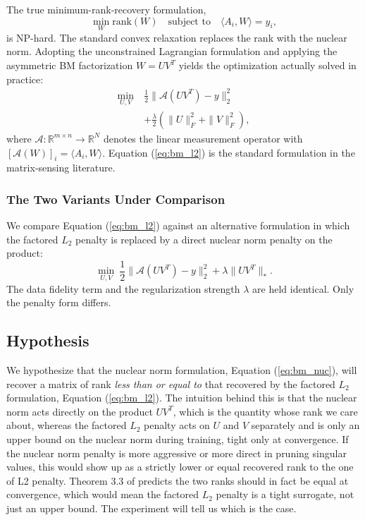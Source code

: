 The true minimum-rank-recovery formulation,
\begin{equation}
    \min_{W} \text{rank}(W) \quad \text{subject to} \quad \langle A_i, W \rangle = y_i,
\end{equation}
is NP-hard. The standard convex relaxation replaces the rank with the nuclear norm. Adopting the unconstrained Lagrangian formulation and applying the asymmetric BM factorization $W = UV^T$ yields the optimization actually solved in practice:
\begin{equation}
\begin{aligned}
    \min_{U, V} \ &\frac{1}{2}\|\mathcal{A}(UV^T) - y\|_2^2 \\
    &+ \frac{\lambda}{2}\left(\|U\|_F^2 + \|V\|_F^2\right),
\end{aligned}
    \label{eq:bm_l2}
\end{equation}
where $\mathcal{A}: \mathbb{R}^{m \times n} \to \mathbb{R}^N$ denotes the linear measurement operator with $[\mathcal{A}(W)]_i = \langle A_i, W \rangle$. Equation (\ref{eq:bm_l2}) is the standard formulation in the matrix-sensing literature.

\subsubsection{The Two Variants Under Comparison}
We compare Equation (\ref{eq:bm_l2}) against an alternative formulation in which the factored $L_2$ penalty is replaced by a direct nuclear norm penalty on the product:
\begin{equation}
    \min_{U, V} \ \frac{1}{2}\|\mathcal{A}(UV^T) - y\|_2^2 + \lambda \|UV^T\|_*.
    \label{eq:bm_nuc}
\end{equation}
The data fidelity term and the regularization strength $\lambda$ are held identical. Only the penalty form differs.

\subsection{Hypothesis}
We hypothesize that the nuclear norm formulation, Equation (\ref{eq:bm_nuc}), will recover a matrix of rank \textit{less than or equal to} that recovered by the factored $L_2$ formulation, Equation (\ref{eq:bm_l2}). The intuition behind this is that the nuclear norm acts directly on the product $UV^T$, which is the quantity whose rank we care about, whereas the factored $L_2$ penalty acts on $U$ and $V$ separately and is only an upper bound on the nuclear norm during training, tight only at convergence. If the nuclear norm penalty is more aggressive or more direct in pruning singular values, this would show up as a strictly lower or equal  recovered rank to the one of L2 penalty. Theorem 3.3 of \cite{kobayashi2024lowrank} predicts the two ranks should in fact be equal at convergence, which would mean the factored $L_2$ penalty is a tight surrogate, not just an upper bound. The experiment will tell us which is the case.


